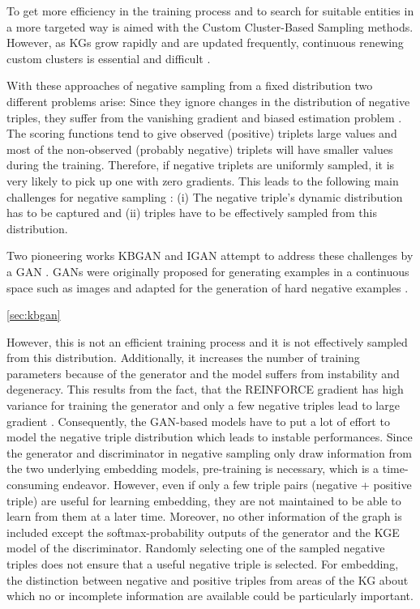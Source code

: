 To get more efficiency in the training process and to search for suitable entities in a more targeted way is aimed with the Custom Cluster-Based Sampling methods.
However, as \acp{KG} grow rapidly and are updated frequently, continuous renewing custom clusters is essential and difficult \cite{qianunderstanding}.

With these approaches of negative sampling from a fixed distribution two different problems arise:
Since they ignore changes in the distribution of negative triples, they suffer from the vanishing gradient and biased estimation problem \cite{zhang2021efficient}.
The scoring functions tend to give observed (positive) triplets large values and most of the non-observed (probably negative) triplets will have smaller values during the training.
Therefore, if negative triplets are uniformly sampled, it is very likely to pick up one with zero gradients.
This leads to the following main challenges for negative sampling \cite{zhang2021efficient}: 
(i) The negative triple's dynamic distribution has to be captured and 
(ii) triples have to be effectively sampled from this distribution.

Two pioneering works \ac{KBGAN} \cite{cai2017kbgan} and \ac{IGAN} \cite{IGAN} attempt to address these challenges by a \ac{GAN} \cite{zhang2021efficient}.
\acp{GAN} were originally proposed for generating examples in a continuous space such as images and adapted for the generation of hard negative examples \cite{zhang2021efficient}.

\autoref{sec:kbgan}


However, this is not an efficient training process and it is not effectively sampled from this distribution.
Additionally, it increases the number of training parameters because of the generator and the model suffers from instability and degeneracy.
This results from the fact, that the \textsc{REINFORCE} gradient has high variance for training the generator and only a few negative triples lead to large gradient \cite{zhang2021efficient}.
Consequently, the \ac{GAN}-based models have to put a lot of effort to model the negative triple distribution which leads to instable performances.
Since the generator and discriminator in negative sampling only draw information from the two underlying embedding models, pre-training is necessary, which is a time-consuming endeavor.
However, even if only a few triple pairs (negative + positive triple) are useful for learning embedding, they are not maintained to be able to learn from them at a later time.
Moreover, no other information of the graph is included except the softmax-probability outputs of the generator and the \ac{KGE} model of the discriminator.
Randomly selecting one of the sampled negative triples does not ensure that a useful negative triple is selected.
For embedding, the distinction between negative and positive triples from areas of the KG about which no or incomplete information are available could be particularly important.

